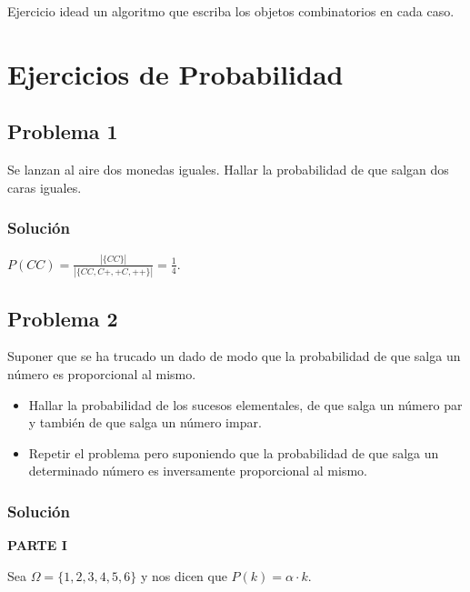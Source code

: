 \documentclass[
]{article}
\providecommand{\tightlist}{%
  \setlength{\itemsep}{0pt}\setlength{\parskip}{0pt}}
\begin{document}
Ejercicio idead un algoritmo que escriba los objetos combinatorios en
cada caso.

\hypertarget{ejercicios-de-probabilidad}{%
\section{Ejercicios de Probabilidad}\label{ejercicios-de-probabilidad}}

\hypertarget{problema-1-1}{%
\subsection{Problema 1}\label{problema-1-1}}

Se lanzan al aire dos monedas iguales. Hallar la probabilidad de que
salgan dos caras iguales.

\hypertarget{soluciuxf3n-1}{%
\subsubsection{Solución}\label{soluciuxf3n-1}}

\(P(CC)=\frac{\left|\{CC\}\right|}{\left|\{CC,C+,+C,++\}\right|}=\frac{1}{4}.\)

\hypertarget{problema-2}{%
\subsection{Problema 2}\label{problema-2}}

Suponer que se ha trucado un dado de modo que la probabilidad de que
salga un número es proporcional al mismo.

\begin{itemize}
\tightlist
\item
  Hallar la probabilidad de los sucesos elementales, de que salga un
  número par y también de que salga un número impar.
\item
  Repetir el problema pero suponiendo que la probabilidad de que salga
  un determinado número es inversamente proporcional al mismo.
\end{itemize}

\hypertarget{soluciuxf3n-2}{%
\subsubsection{Solución}\label{soluciuxf3n-2}}

\textbf{PARTE I}

Sea \(\Omega=\{1,2,3,4,5,6\}\) y nos dicen que \(P(k)= \alpha\cdot k\).
\end{document}
